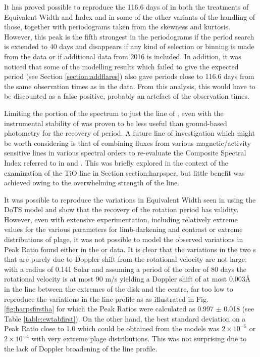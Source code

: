 It has proved possible to reproduce the 116.6 days of \citet[Table 3]{suarezmascareno15} in both the treatments of
Equivalent Width and {\ha} Index and in some of the other variants of the handling of those, together with periodograms
taken from the skewness and kurtosis. However, this peak is the fifth strongest in the periodograms if the period search
is extended to 40 days and disappears if any kind of selection or binning is made from the data or if additional data
from 2016 is included. In addition, it was noticed that some of the modelling results which failed to give the expected
period (see Section \ref{section:addflares}) also gave periods close to 116.6 days from the same observation times as in
the {\harps} data. From this analysis, this would have to be discounted as a false positive, probably an artefact of the
observation times.

Limiting the portion of the spectrum to just the {\ha} line of \prox, even with the instrumental stability of {\harps}
was proven to be less useful than {\asas} ground-based photometry for the recovery of period. A future line of
investigation which might be worth considering is that of combining fluxes from various magnetic/activity sensitive
lines in various spectral orders to re-evaluate the Composite Spectral Index referred to in \citet{hall99} and
\citet{hall00}. This was briefly explored in the context of the examination of the TiO line in Section
{section:harpsper}, but little benefit was achieved owing to the overwhelming strength of the {\ha} line.

It was possible to reproduce the variations in Equivalent Width seen in {\prox} using the DoTS model and show that the
recovery of the rotation period has validity. However, even with extensive experimentation, including relatively extreme
values for the various parameters for limb-darkening and contrast or extreme distributions of plage, it was not possible
to model the observed variations in Peak Ratio found either in the {\uves} or {\harps} data. It is clear that the
variations in the two \horn s that are purely due to Doppler shift from the rotational velocity are not large; with a
radius of 0.141 Solar \citep{demory09} and assuming a period of the order of 80 days the rotational velocity is at most
90 m/s yielding a Doppler shift of at most 0.003{\AA} in the {\ha} line between the extremes of the disk and the centre,
far too low to reproduce the variations in the {\ha} line profile as as illustrated in Fig. \ref{fig:harpsfirstha} for
which the Peak Ratios were calculated as 0.997 $ \pm $ 0.018 (see Table \ref{table:ewtabfirst}). On the other hand, the
best standard deviation on a Peak Ratio close to 1.0 which could be obtained from the models was $2{\times}10^{-5}$ or
$2{\times}10^{-4}$ with very extreme plage distributions. This was not surprising due to the lack of Doppler broadening
of the line profile.


